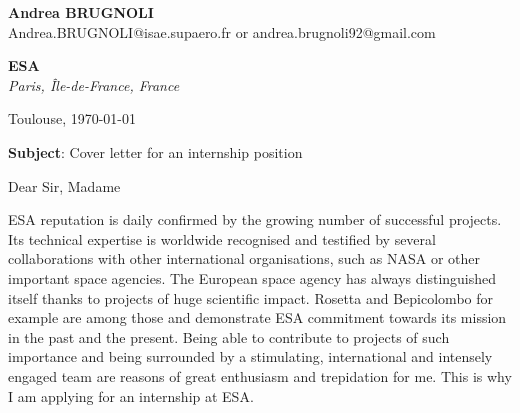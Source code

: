 \documentclass[11pt]{letter}
\begin{document}
 \begin{flushleft}
 {\bfseries Andrea \textsc{BRUGNOLI}}\\[.35ex]
 Andrea.BRUGNOLI@isae.supaero.fr or andrea.brugnoli92@gmail.com
 \end{flushleft}
 \begin{flushright}
 {\bfseries ESA}\\[.35ex]
 \small\itshape
 Paris, Île-de-France, France
 \end{flushright}
 \begin{flushright}
 Toulouse, \today 
 \end{flushright}
 \textbf{Subject}: Cover letter for an internship position

 Dear Sir, Madame

ESA reputation is daily confirmed by the growing number of successful projects. Its technical expertise is worldwide recognised and testified by several collaborations with other international organisations, such as NASA or other important space agencies. The European space agency has always distinguished itself thanks to projects of huge scientific impact. Rosetta and Bepicolombo for example are among those and demonstrate ESA commitment towards its mission in the past and the present. Being able to contribute to projects of such importance and being surrounded by a stimulating, international and intensely engaged team are reasons of great enthusiasm and trepidation for me. This is why I am applying  for an internship at ESA. 
\end{document}

